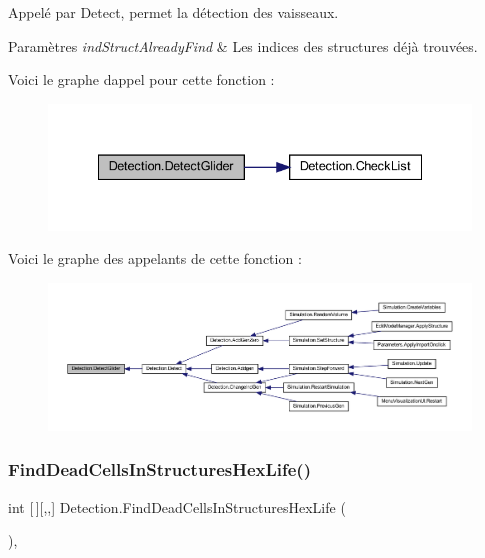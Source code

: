 Appelé par Detect, permet la détection des vaisseaux. 


\begin{DoxyParams}{Paramètres}
{\em ind\+Struct\+Already\+Find} & Les indices des structures déjà trouvées.\\
\hline
\end{DoxyParams}
Voici le graphe d\textquotesingle{}appel pour cette fonction \+:
\nopagebreak
\begin{figure}[H]
\begin{center}
\leavevmode
\includegraphics[width=335pt]{class_detection_a88c0afc7566ffe8ac32fe1c21da192df_cgraph}
\end{center}
\end{figure}
Voici le graphe des appelants de cette fonction \+:
\nopagebreak
\begin{figure}[H]
\begin{center}
\leavevmode
\includegraphics[width=350pt]{class_detection_a88c0afc7566ffe8ac32fe1c21da192df_icgraph}
\end{center}
\end{figure}
\mbox{\label{class_detection_ac836468018dc40fd2261136a035eb25a}} 
\subsubsection{\texorpdfstring{Find\+Dead\+Cells\+In\+Structures\+Hex\+Life()}{FindDeadCellsInStructuresHexLife()}}
{\footnotesize\ttfamily int \mbox{[}$\,$\mbox{]}\mbox{[},,\mbox{]} Detection.\+Find\+Dead\+Cells\+In\+Structures\+Hex\+Life (\begin{DoxyParamCaption}{ }\end{DoxyParamCaption})\hspace{0.3cm}{\ttfamily [inline]}, {\ttfamily [private]}}



